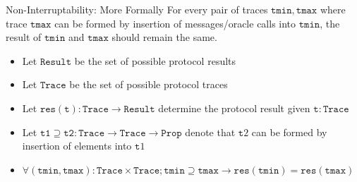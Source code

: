 \begin{frame}{Non-Interruptability: More Formally}
    For every pair of traces $\mathtt{tmin}, \mathtt{tmax}$ where trace $\mathtt{tmax}$ can be formed by
    insertion of messages/oracle calls into $\mathtt{tmin}$, the result of $\mathtt{tmin}$ and $\mathtt{tmax}$
    should remain the same.

	

    \begin{itemize}
      \item Let $\mathtt{Result}$ be the set of possible protocol results
      \item Let $\mathtt{Trace}$ be the set of possible protocol traces
      \item Let $\mathtt{res}(\mathtt{t}) : \mathtt{Trace} \to \mathtt{Result}$ determine the protocol result given $\mathtt{t} : \mathtt{Trace}$
      \item Let $\mathtt{t1} \supseteq \mathtt{t2} : \mathtt{Trace} \to \mathtt{Trace} \to \mathtt{Prop}$ denote that $\mathtt{t}2$ can be formed by insertion of elements into $\mathtt{t}1$
      \item $\forall (\mathtt{tmin}, \mathtt{tmax}) : \mathtt{Trace} \times \mathtt{Trace}; \mathtt{tmin} \supseteq \mathtt{tmax} \to \mathtt{res}(\mathtt{tmin}) = \mathtt{res}(\mathtt{tmax})$
    \end{itemize}
\end{frame}




